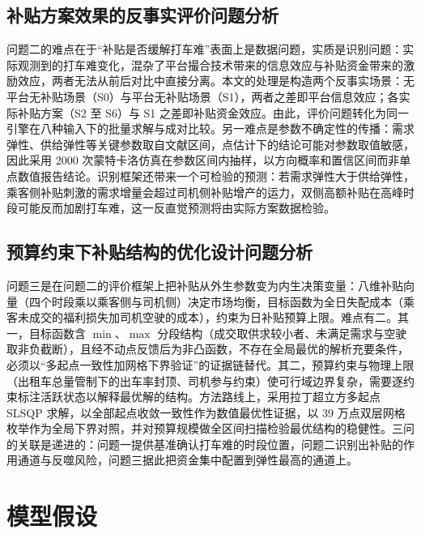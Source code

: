 \documentclass[12pt,a4paper]{ctexart}
\begin{document}
\subsection{补贴方案效果的反事实评价问题分析}

问题二的难点在于“补贴是否缓解打车难”表面上是数据问题，实质是识别问题：实际观测到的打车难变化，混杂了平台撮合技术带来的信息效应与补贴资金带来的激励效应，两者无法从前后对比中直接分离。本文的处理是构造两个反事实场景：无平台无补贴场景（S0）与平台无补贴场景（S1），两者之差即平台信息效应；各实际补贴方案（S2 至 S6）与 S1 之差即补贴资金效应。由此，评价问题转化为同一引擎在八种输入下的批量求解与成对比较。另一难点是参数不确定性的传播：需求弹性、供给弹性等关键参数取自文献区间，点估计下的结论可能对参数取值敏感，因此采用 2000 次蒙特卡洛仿真在参数区间内抽样，以方向概率和置信区间而非单点数值报告结论。识别框架还带来一个可检验的预测：若需求弹性大于供给弹性，乘客侧补贴刺激的需求增量会超过司机侧补贴增产的运力，双侧高额补贴在高峰时段可能反而加剧打车难，这一反直觉预测将由实际方案数据检验。

\subsection{预算约束下补贴结构的优化设计问题分析}

问题三是在问题二的评价框架上把补贴从外生参数变为内生决策变量：八维补贴向量（四个时段乘以乘客侧与司机侧）决定市场均衡，目标函数为全日失配成本（乘客未成交的福利损失加司机空驶的成本），约束为日补贴预算上限。难点有二。其一，目标函数含 $\min$、$\max$ 分段结构（成交取供求较小者、未满足需求与空驶取非负截断），且经不动点反馈后为非凸函数，不存在全局最优的解析充要条件，必须以“多起点一致性加网格下界验证”的证据链替代。其二，预算约束与物理上限（出租车总量管制下的出车率封顶、司机参与约束）使可行域边界复杂，需要逐约束标注活跃状态以解释最优解的结构。方法路线上，采用拉丁超立方多起点 SLSQP 求解，以全部起点收敛一致性作为数值最优性证据，以 39 万点双层网格枚举作为全局下界对照，并对预算规模做全区间扫描检验最优结构的稳健性。三问的关联是递进的：问题一提供基准确认打车难的时段位置，问题二识别出补贴的作用通道与反噬风险，问题三据此把资金集中配置到弹性最高的通道上。

\section{模型假设}
\end{document}
